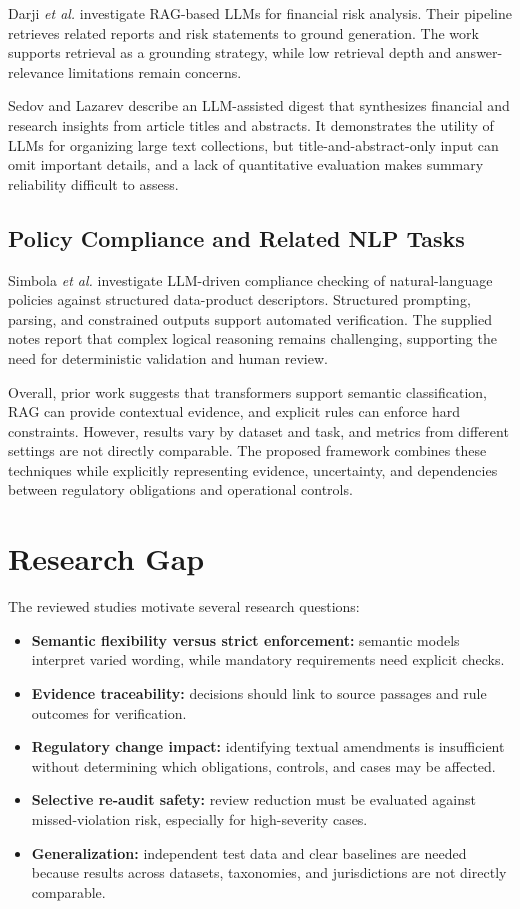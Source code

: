 \documentclass[conference]{IEEEtran}
\begin{document}
Darji \emph{et al.} \cite{darji2024} investigate RAG-based LLMs for financial risk analysis. Their pipeline retrieves related reports and risk statements to ground generation. The work supports retrieval as a grounding strategy, while low retrieval depth and answer-relevance limitations remain concerns.

Sedov and Lazarev \cite{sedov2024} describe an LLM-assisted digest that synthesizes financial and research insights from article titles and abstracts. It demonstrates the utility of LLMs for organizing large text collections, but title-and-abstract-only input can omit important details, and a lack of quantitative evaluation makes summary reliability difficult to assess.

\subsection{Policy Compliance and Related NLP Tasks}
Simbola \emph{et al.} \cite{simbola2026} investigate LLM-driven compliance checking of natural-language policies against structured data-product descriptors. Structured prompting, parsing, and constrained outputs support automated verification. The supplied notes report that complex logical reasoning remains challenging, supporting the need for deterministic validation and human review.

Overall, prior work suggests that transformers support semantic classification, RAG can provide contextual evidence, and explicit rules can enforce hard constraints. However, results vary by dataset and task, and metrics from different settings are not directly comparable. The proposed framework combines these techniques while explicitly representing evidence, uncertainty, and dependencies between regulatory obligations and operational controls.

\section{Research Gap}
The reviewed studies motivate several research questions:
\begin{itemize}
\item \textbf{Semantic flexibility versus strict enforcement:} semantic models interpret varied wording, while mandatory requirements need explicit checks.
\item \textbf{Evidence traceability:} decisions should link to source passages and rule outcomes for verification.
\item \textbf{Regulatory change impact:} identifying textual amendments is insufficient without determining which obligations, controls, and cases may be affected.
\item \textbf{Selective re-audit safety:} review reduction must be evaluated against missed-violation risk, especially for high-severity cases.
\item \textbf{Generalization:} independent test data and clear baselines are needed because results across datasets, taxonomies, and jurisdictions are not directly comparable.
\end{itemize}
\end{document}

